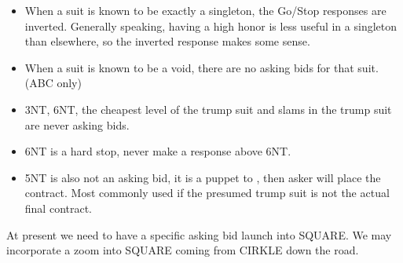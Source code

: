 \documentclass[tom-ari]{subfile}
\begin{document}
\begin{itemize}
	\item When a suit is known to be exactly a singleton, the Go/Stop responses are inverted.  Generally speaking, having a high honor is less useful in a singleton than elsewhere, so the inverted response makes some sense. 
	\item When a suit is known to be a void, there are no asking bids for that suit. (ABC only)
	\item 3NT, 6NT, the cheapest level of the trump suit and slams in the trump suit are never asking bids.
	\item 6NT is a hard stop, never make a response above 6NT.  
	\item 5NT is also not an asking bid, it is a puppet to , then asker will place the contract.  Most commonly used if the presumed trump suit is not the actual final contract.
\end{itemize}

At present we need to have a specific asking bid launch into SQUARE.  We may incorporate a zoom into SQUARE coming from CIRKLE down the road.
	
\end{document}
